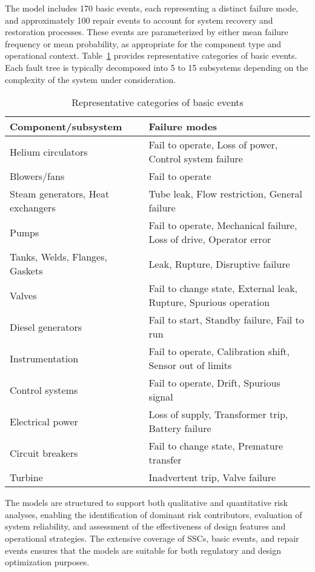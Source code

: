 The model includes 170 basic events, each representing a distinct failure mode, and approximately 100 repair events to account for system recovery and restoration processes. These events are parameterized by either mean failure frequency or mean probability, as appropriate for the component type and operational context. Table~\ref{tab:mhtgr-basic-event-types} provides representative categories of basic events. Each fault tree is typically decomposed into 5 to 15 subsystems depending on the complexity of the system under consideration.

\begin{table}
    \centering
    \caption{Representative categories of basic events}
    \label{tab:mhtgr-basic-event-types}
    \begin{tabular}{ll}
        \toprule
        \textbf{Component/subsystem} & \textbf{Failure modes} \\
        \midrule
        Helium circulators & Fail to operate, Loss of power, Control system failure \\
        Blowers/fans & Fail to operate \\
        Steam generators, Heat exchangers & Tube leak, Flow restriction, General failure \\
        Pumps & Fail to operate, Mechanical failure, Loss of drive, Operator error \\
        Tanks, Welds, Flanges, Gaskets & Leak, Rupture, Disruptive failure \\
        Valves & Fail to change state, External leak, Rupture, Spurious operation \\
        Diesel generators & Fail to start, Standby failure, Fail to run \\
        Instrumentation & Fail to operate, Calibration shift, Sensor out of limits \\
        Control systems & Fail to operate, Drift, Spurious signal \\
        Electrical power & Loss of supply, Transformer trip, Battery failure \\
        Circuit breakers & Fail to change state, Premature transfer \\
        Turbine & Inadvertent trip, Valve failure \\
        \bottomrule
    \end{tabular}
\end{table}

\renewcommand{\arraystretch}{1.0}
The models are structured to support both qualitative and quantitative risk analyses, enabling the identification of dominant risk contributors, evaluation of system reliability, and assessment of the effectiveness of design features and operational strategies. The extensive coverage of SSCs, basic events, and repair events ensures that the models are suitable for both regulatory and design optimization purposes.
